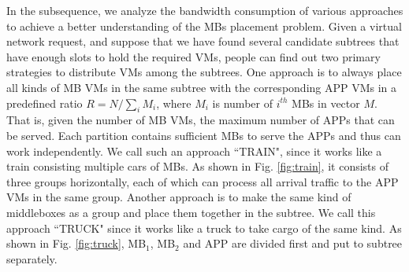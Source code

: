 \documentclass[10pt, conference, letterpaper]{IEEEtran}
\begin{document}
In the subsequence, we analyze the bandwidth consumption of various approaches to achieve a better understanding of the MBs placement problem. Given a virtual network request, and suppose that we have found several candidate subtrees that have enough slots to hold the required VMs, people can find out two primary strategies to distribute VMs among the subtrees. One approach is to always place all kinds of MB VMs in the same subtree with the corresponding APP VMs in a predefined ratio $R=N/\sum_{i} M_{i}$, where $M_{i}$ is number of $i^{th}$ MBs in vector $M$. That is, given the number of MB VMs, the maximum number of APPs that can be served. Each partition contains sufficient MBs to serve the APPs and thus can work independently. We call such an approach ``TRAIN", since it works like a train consisting multiple cars of MBs. As shown in Fig. \ref{fig:train}, it consists of three groups horizontally, each of which can process all arrival traffic to the APP VMs in the same group. Another approach is to make the same kind of middleboxes as a group and place them together in the subtree. We call this approach ``TRUCK" since it works like a truck to take cargo of the same kind. As shown in Fig. \ref{fig:truck}, MB$_{1}$, MB$_{2}$ and APP are divided first and put to subtree separately.

\end{document}
